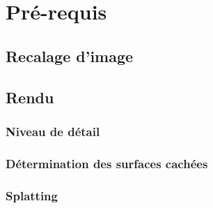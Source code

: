 \part{Pré-requis}


\chapter{Recalage d'image}



\chapter{Rendu}
\section{Niveau de détail}
\section{Détermination des surfaces cachées}
\section{Splatting}
